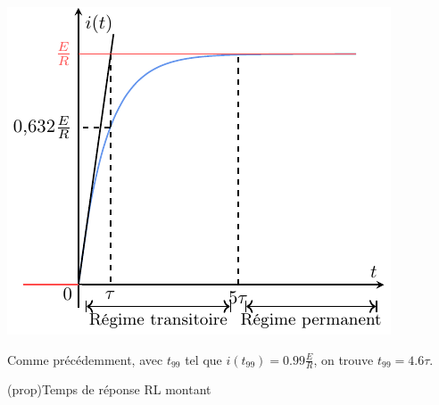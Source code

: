 \documentclass[../../main/main.tex]{subfiles}
\begin{document}
\begin{tcb*}[label=impl:déterm, sidebyside, righthand ratio=.4]
{		\includegraphics[width=\linewidth]{carac_rl-tau}
	}%
\end{tcb*}

Comme précédemment, avec $t_{99}$ tel que $i(t_{99}) = \num{0.99}\frac{E}{R}$,
on trouve $t_{99} = \num{4.6}\tau$.
\begin{tcb}(prop){Temps de réponse RL montant}
	{}
\end{tcb}
\end{document}
